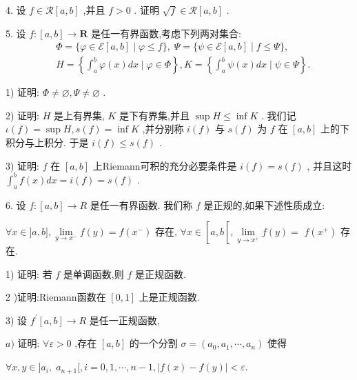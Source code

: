 4. 设 $f \in  \mathcal{R}\left\lbrack  {a,b}\right\rbrack$ ,并且 $f > 0$ . 证明 $\sqrt{f} \in  \mathcal{R}\left\lbrack  {a,b}\right\rbrack$ .

5. 设 $f : \left\lbrack  {a,b}\right\rbrack   \rightarrow  \mathbf{R}$ 是任一有界函数,考虑下列两对集合:
\begin{align*}
	&\Phi  = \{ \varphi  \in  \mathcal{E}\left\lbrack  {a,b}\right\rbrack   \mid  \varphi  \leq  f\} ,\;\Psi  = \{ \psi  \in  \mathcal{E}\left\lbrack  {a,b}\right\rbrack   \mid  f \leq  \Psi \} ,\\
	&H = \left\{  {{\int }_{a}^{b}\varphi \left( x\right) {dx} \mid  \varphi  \in  \Phi }\right\}  ,K = \left\{  {{\int }_{a}^{b}\psi \left( x\right) {dx} \mid  \psi  \in  \Psi }\right\}  .
\end{align*}

1) 证明: $\Phi  \neq  \varnothing ,\Psi  \neq  \varnothing$ .

2) 证明: $H$ 是上有界集, $K$ 是下有界集,并且 $\sup H \leq  \inf K$ . 我们记 $\iota \left( f\right)  = \sup H,s\left( f\right)  = \inf K$ ,并分别称 $i\left( f\right)$ 与 $s\left( f\right)$ 为 $f$ 在 $\left\lbrack  {a,b}\right\rbrack$ 上的下积分与上积分. 于是 $i\left( f\right)  \leq  s\left( f\right)$ .

3) 证明: $f$ 在 $\left\lbrack  {a,b}\right\rbrack$ 上Riemann可积的充分必要条件是 $i\left( f\right)  = s\left( f\right)$ , 并且这时 ${\int }_{a}^{b}f\left( x\right) {dx} = i\left( f\right)  = s\left( f\right)$ .

6. 设 $f : \left\lbrack  {a,b}\right\rbrack   \rightarrow  R$ 是任一有界函数. 我们称 $f$ 是正规的,如果下述性质成立:

$\forall x \in  \rbrack a,b\rbrack ,\mathop{\lim }\limits_{{y \rightarrow  {x}^{ - }}}f\left( y\right)  = f\left( {x}^{ - }\right)$ 存在, $\forall x \in  \left\lbrack  {a,b\left\lbrack  {,\mathop{\lim }\limits_{{y \rightarrow  {x}^{ + }}}f\left( y\right)  = }\right. }\right.$  $f\left( {x}^{ + }\right)$ 存在.

1) 证明: 若 $f$ 是单调函数,则 $f$ 是正规函数.

2 )证明:Riemann函数在 $\left\lbrack  {0,1}\right\rbrack$ 上是正规函数.

3) 设 ${f}^{\prime }\left\lbrack  {a,b}\right\rbrack   \rightarrow  R$ 是任一正规函数,

$a)$ 证明: $\forall \varepsilon  > 0$ ,存在 $\left\lbrack  {a,b}\right\rbrack$ 的一个分割 $\sigma  = \left( {{a}_{0},{a}_{1},\cdots ,{a}_{n}}\right)$ 使得

$\forall x,y \in  \rbrack {a}_{i},\;{a}_{n + 1}\lbrack ,i = 0,1,\cdots ,n - 1,\left| {f\left( x\right)  - f\left( y\right) }\right|  < \varepsilon .$

